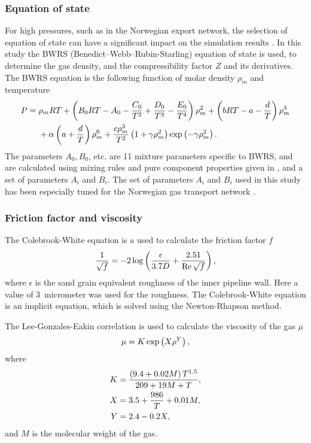 \subsubsection{Equation of state}
For high pressures, such as in the Norwegian export network, the selection of equation of state can have a significant impact on the simulation results \cite{Helgaker2014Validation,Chaczykowski2009Sensitivity}. In this study the BWRS (Benedict–Webb–Rubin-Starling) equation of state \cite{Starling1973Fluid} is used, to determine the gas density, and the compressibility factor $Z$ and its derivatives. The BWRS equation is the following function of molar density $\rho_m$ and temperature
\begin{align}
\begin{split}
    P ={} &\rho_m RT 
    + \del{B_0 RT - A_0 - \frac{C_0}{T^2} + \frac{D_0}{T^3} - \frac{E_0}{T^4}}\rho_m^2 
    + \del{bRT - a - \frac{d}{T}}\rho_m^3 
    \\&
    + \alpha \del{a + \frac{d}{T}}\rho_m^6 
    + \frac{c\rho_m^3}{T^2}\del{1 + \gamma \rho_m^2} \exp\del{-\gamma \rho_m^2}
.
\end{split}
\end{align}
The parameters $A_0, B_0$, etc. are 11 mixture parameters specific to BWRS, and are calculated using mixing rules and pure component properties given in \cite{Starling1973Fluid}, and a set of parameters $A_i$ and $B_i$. %
The set of parameters $A_i$ and $B_i$ used in this study has been especially tuned for the Norwegian gas transport network \cite{Calsep}.

\subsubsection{Friction factor and viscosity}
The Colebrook-White equation \cite{Colebrook1939Turbulent} is a  used to calculate the friction factor $f$
\begin{align}
    \frac{1}{\sqrt{f}} = -2\log \del{\frac{\epsilon}{3.7 D} + \frac{2.51}{\Reyn \sqrt{f}}}
    \label{eq:colebrookWhite}
,
\end{align}
where $\epsilon$ is the sand grain equivalent roughness of the inner pipeline wall. Here a value of 3~micrometer was used for the roughness. The Colebrook-White equation is an implicit equation, which is solved using the Newton-Rhapson method. 

The Lee-Gonzales-Eakin correlation \cite{Lee1966Viscosity} is used to calculate the viscosity of the gas $\mu$
\begin{align}
    \mu = K\exp\del{X\rho^Y},
\label{eq:LGE}
\end{align}
where
\begin{align}
    K &= \frac{\del{9.4+0.02M} T^{1.5}}{209 + 19 M + T}, \\
    X &= 3.5 + \frac{986}{T} + 0.01 M, \\
    Y &= 2.4 - 0.2X
,
\end{align}
and $M$ is the molecular weight of the gas.